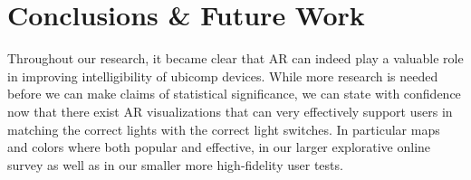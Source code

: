 \chapter{Conclusions \& Future Work} \label{chap:concl}
Throughout our research, it became clear that AR can indeed play a valuable role in improving intelligibility of ubicomp devices. While more research is needed before we can make claims of statistical significance, we can state with confidence now that there exist AR visualizations that can very effectively support users in matching the correct lights with the correct light switches. In particular maps and colors where both popular and effective, in our larger explorative online survey as well as in our smaller more high-fidelity user tests.



